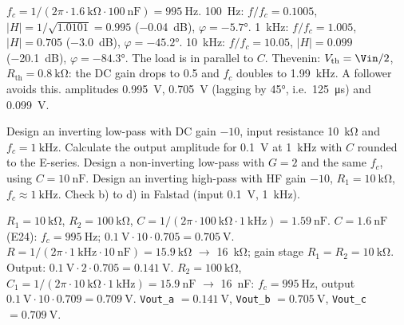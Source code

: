 \begin{solution}
\begin{talist}
\ta $f_c = 1/(2\pi\cdot\SI{1.6}{\kilo\ohm}\cdot\SI{100}{\nano\farad}) = \SI{995}{\hertz}$.
\ta \SI{100}{\hertz}: $f/f_c = 0.1005$, $|H| = 1/\sqrt{1.0101} = 0.995$ (\SI{-0.04}{\deci\bel}), $\varphi = \ang{-5.7}$.\newline
    \SI{1}{\kilo\hertz}: $f/f_c = 1.005$, $|H| = 0.705$ (\SI{-3.0}{\deci\bel}), $\varphi = \ang{-45.2}$.\newline
    \SI{10}{\kilo\hertz}: $f/f_c = 10.05$, $|H| = 0.099$ (\SI{-20.1}{\deci\bel}), $\varphi = \ang{-84.3}$.
\ta The load is in parallel to $C$. Thevenin: $V_\mathrm{th} = \Vin/2$, $R_\mathrm{th} = \SI{0.8}{\kilo\ohm}$:
    the DC gain drops to 0.5 and $f_c$ doubles to \SI{1.99}{\kilo\hertz}. A follower avoids this.
\ta {}\newline amplitudes \SI{0.995}{\volt}, \SI{0.705}{\volt} (lagging by \ang{45}, i.e.\ \SI{125}{\micro\second}) and \SI{0.099}{\volt}.
\end{talist}
\end{solution}

\label{ex:filt-active}
\begin{talist}
\ta Design an inverting low-pass with DC gain $-10$, input resistance \SI{10}{\kilo\ohm} and $f_c = \SI{1}{\kilo\hertz}$.
\ta Calculate the output amplitude for \SI{0.1}{\volt} at \SI{1}{\kilo\hertz} with $C$ rounded to the E-series.
\ta Design a non-inverting low-pass with $G=2$ and the same $f_c$, using $C = \SI{10}{\nano\farad}$.
\ta Design an inverting high-pass with HF gain $-10$, $R_1 = \SI{10}{\kilo\ohm}$, $f_c\approx\SI{1}{\kilo\hertz}$.
\ta Check b) to d) in Falstad (input \SI{0.1}{\volt}, \SI{1}{\kilo\hertz}).
\end{talist}

\begin{solution}
\begin{talist}
\ta $R_1 = \SI{10}{\kilo\ohm}$, $R_2 = \SI{100}{\kilo\ohm}$, $C = 1/(2\pi\cdot\SI{100}{\kilo\ohm}\cdot\SI{1}{\kilo\hertz}) = \SI{1.59}{\nano\farad}$.
\ta $C = \SI{1.6}{\nano\farad}$ (E24): $f_c = \SI{995}{\hertz}$; $\SI{0.1}{\volt}\cdot 10\cdot 0.705 = \SI{0.705}{\volt}$.
\ta $R = 1/(2\pi\cdot\SI{1}{\kilo\hertz}\cdot\SI{10}{\nano\farad}) = \SI{15.9}{\kilo\ohm}$ $\rightarrow$ \SI{16}{\kilo\ohm}; gain stage $R_1=R_2=\SI{10}{\kilo\ohm}$.
    Output: $\SI{0.1}{\volt}\cdot 2\cdot 0.705 = \SI{0.141}{\volt}$.
\ta $R_2 = \SI{100}{\kilo\ohm}$, $C_1 = 1/(2\pi\cdot\SI{10}{\kilo\ohm}\cdot\SI{1}{\kilo\hertz}) = \SI{15.9}{\nano\farad}$ $\rightarrow$ \SI{16}{\nano\farad}:
    $f_c = \SI{995}{\hertz}$, output $\SI{0.1}{\volt}\cdot 10\cdot 0.709 = \SI{0.709}{\volt}$.
\ta {}\newline \texttt{Vout\_a} $= \SI{0.141}{\volt}$, \texttt{Vout\_b} $= \SI{0.705}{\volt}$, \texttt{Vout\_c} $= \SI{0.709}{\volt}$.
\end{talist}
\end{solution}

